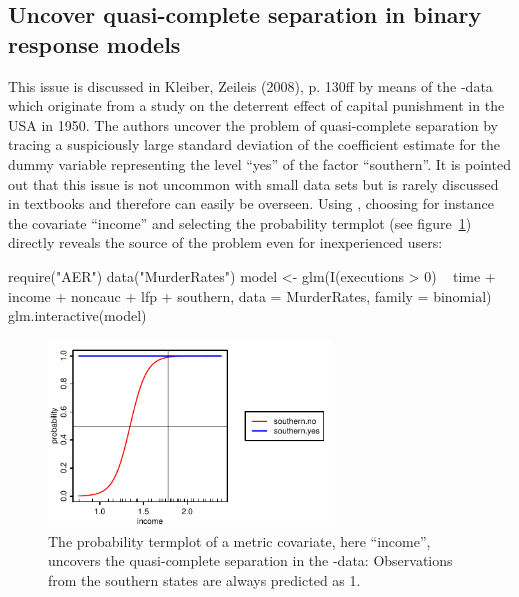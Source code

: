 \documentclass[nojss]{jss}
\newcommand{\quotes}[1]{``#1''}
\begin{document}
\subsection{Uncover quasi-complete separation in binary response models}
This issue is discussed in Kleiber, Zeileis (2008), p. 130ff by means of the -data which originate from a study on the deterrent effect of capital punishment in the USA in 1950. The authors uncover the problem of quasi-complete separation by tracing a suspiciously large standard deviation of the coefficient estimate for the dummy variable representing the level \quotes{yes} of the factor \quotes{southern}. It is pointed out that this issue is not uncommon with small data sets but is rarely discussed in textbooks and therefore can easily be overseen. Using , choosing for instance the covariate \quotes{income} and selecting the probability termplot (see figure~\ref{fig-qcs}) directly reveals the source of the problem even for inexperienced users:
%
\begin{Schunk}
\begin{Sinput}
 require("AER")
 data("MurderRates")
 model <- glm(I(executions > 0) ~ time + income + noncauc + lfp + southern, 
     data = MurderRates, family = binomial)
 glm.interactive(model)
\end{Sinput}
\end{Schunk}
%

\begin{figure}[ht]
\centering
\includegraphics[width=7.5cm]{mr-income-resp-001}
\caption{The probability termplot of a metric covariate, here \quotes{income}, uncovers the quasi-complete separation in the -data: Observations from the southern states are always predicted as 1.} \label{fig-qcs}
\end{figure}
\end{document}
